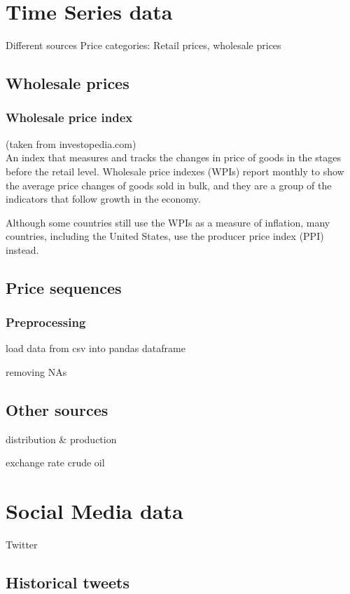 \section*{Time Series data}
Different sources
Price categories: Retail prices, wholesale prices

\subsection*{Wholesale prices}

\subsubsection*{Wholesale price index}
(taken from investopedia.com)\\
An index that measures and tracks the changes in price of goods in the stages before the retail level. Wholesale price indexes (WPIs) report monthly to show the average price changes of goods sold in bulk, and they are a group of the indicators that follow growth in the economy.\par
Although some countries still use the WPIs as a measure of inflation, many countries, including the United States, use the producer price index (PPI) instead.\par

\subsection*{Price sequences}

\subsubsection*{Preprocessing}
load data from csv into pandas dataframe 

removing NAs


\subsection*{Other sources}
distribution \& production

exchange rate
crude oil


\section*{Social Media data}
Twitter

\subsection*{Historical tweets}

